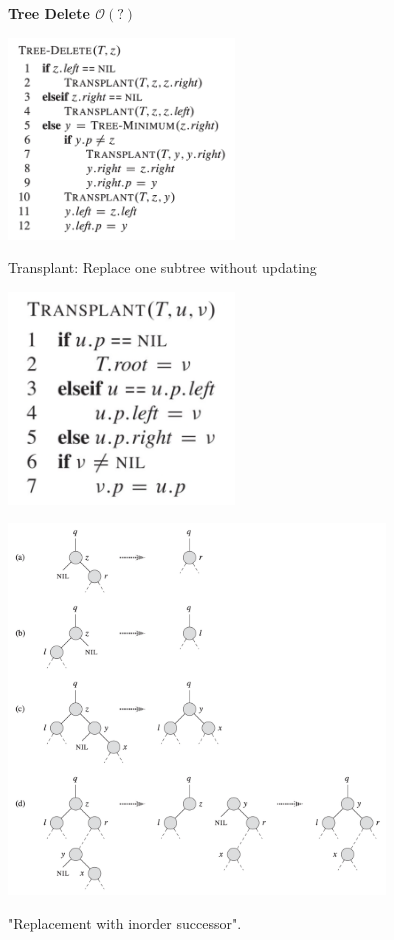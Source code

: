 \documentclass[10pt,a4paper,twocolumn]{article}
\begin{document}
\textbf{Tree Delete $\mathcal{O}(?)$}

\begin{center}
\includegraphics[width=6cm]{images/tree-delete}
\end{center}

Transplant: Replace one subtree without updating
\begin{center}
\includegraphics[width=6cm]{images/transplant-tree}
\end{center}

\begin{center}
\includegraphics[width=10cm]{images/tree-delete-example}
\end{center}
"Replacement with inorder successor".\\
\end{document}
